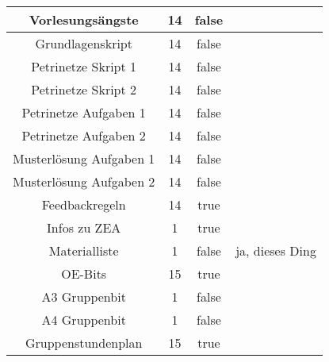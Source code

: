 \documentclass[10pt,a4paper,oneside,ngerman,numbers=noenddot]{scrartcl}
\begin{document}
\begin{table}[ht]
\begin{tabular}{c|c|c|c}
		\hline
		Vorlesungsängste & 14 & false & \\
		\hline
		Grundlagenskript & 14 & false & \\
		\hline
		Petrinetze Skript 1 & 14 & false & \\
		\hline
		Petrinetze Skript 2 & 14 & false & \\
		\hline
		Petrinetze Aufgaben 1 & 14 & false & \\
		\hline
		Petrinetze Aufgaben 2 & 14 & false & \\
		\hline
		Musterlösung Aufgaben 1 & 14 & false & \\
		\hline
		Musterlösung Aufgaben 2 & 14 & false & \\
		\hline
		Feedbackregeln & 14 & true & \\
		\hline
		Infos zu ZEA & 1 & true & \\
		\hline
		Materialliste & 1 & false & ja, dieses Ding \\
		\hline
		OE-Bits & 15 & true & \\
		\hline
		A3 Gruppenbit & 1 & false & \\
		\hline
		A4 Gruppenbit & 1 & false & \\
		\hline
		Gruppenstundenplan & 15 & true &
	\end{tabular}
\end{table}
\end{document}
